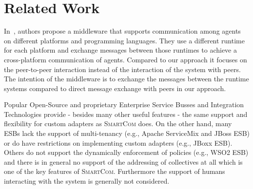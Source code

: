 \documentclass{llncs}
\newcommand{\mdl}{\textsc{SmartCom}}
\begin{document}

\section{Related Work}
\label{sec:relwork}
  
	
  In~\cite{Cabri1}, authors propose a middleware that supports communication among agents on different platforms and programming languages. They use a different runtime for each platform and exchange messages between those runtimes to achieve a cross-platform communication of agents. Compared to our approach it focuses on the peer-to-peer interaction instead of the interaction of the system with peers. The intention of the middleware is to exchange the messages between the runtime systems compared to direct message exchange with peers in our approach.

  Popular Open-Source and proprietary Enterprise Service Busses and Integration Technologies provide - besides many other useful features - the same support and flexibility for custom adapters as \mdl{} does. On the other hand, many ESBs lack the support of multi-tenancy (e.g., Apache ServiceMix and JBoss ESB) or do have restrictions on implementing custom adapters (e.g., JBoxx ESB). Others do not support the dynamically enforcement of policies (e.g., WSO2 ESB) and there is in general no support of the addressing of collectives at all which is one of the key features of \mdl{}. Furthermore the support of humans interacting with the system is generally not considered.
\end{document}
